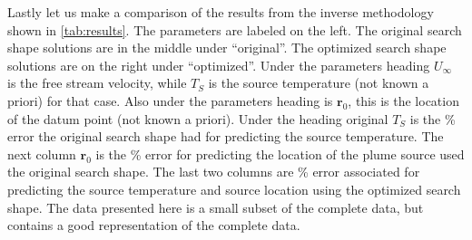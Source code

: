 \documentclass[preprint,12pt]{elsarticle}
\newcommand{\bv}[1]{\boldsymbol #1}  %
\begin{document}
Lastly let us make a comparison of the results from the inverse methodology shown in \cref{tab:results}.  The parameters are labeled on the left.  The original search shape solutions are in the middle under ``original''.  The optimized search shape solutions are on the right under ``optimized''.  Under the parameters heading $U_{\infty}$ is the free stream velocity, while $T_S$ is the source temperature (not known a priori) for that case.  Also under the parameters heading is $\bv{r}_0$, this is the location of the datum point (not known a priori).  Under the heading original $T_S$ is the \% error the original search shape had for predicting the source temperature.  The next column $\bv{r}_0$ is the \% error for predicting the location of the plume source used the original search shape.  The last two columns are \% error associated for predicting the source temperature and source location using the optimized search shape.  The data presented here is a small subset of the complete data, but contains a good representation of the complete data.
%
\end{document}
